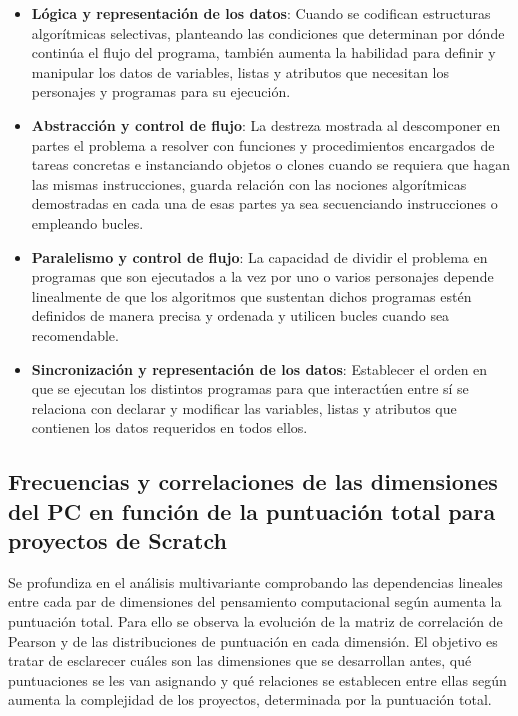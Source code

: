 \documentclass[a4paper, 12pt]{book}
\begin{document}
\begin{itemize}
    \item \textbf{Lógica y representación de los datos}: Cuando se codifican estructuras algorítmicas selectivas, planteando las condiciones que determinan por dónde continúa el flujo del programa, también aumenta la habilidad para definir y manipular los datos de variables, listas y atributos que necesitan los personajes y programas para su ejecución.
    \item \textbf{Abstracción y control de flujo}: La destreza mostrada al descomponer en partes el problema a resolver con funciones y procedimientos encargados de tareas concretas e instanciando objetos o clones cuando se requiera que hagan las mismas instrucciones, guarda relación con las nociones algorítmicas demostradas en cada una de esas partes ya sea secuenciando instrucciones o empleando bucles.
    \item \textbf{Paralelismo y control de flujo}: La capacidad de dividir el problema en programas que son ejecutados a la vez por uno o varios personajes depende linealmente de que los algoritmos que sustentan dichos programas estén definidos de manera precisa y ordenada y utilicen bucles cuando sea recomendable.
    \item \textbf{Sincronización y representación de los datos}: Establecer el orden en que se ejecutan los distintos programas para que interactúen entre sí se relaciona con declarar y modificar las variables, listas y atributos que contienen los datos requeridos en todos ellos.
\end{itemize}


\subsection{Frecuencias y correlaciones de las dimensiones del PC en función de la puntuación total para proyectos de Scratch}
\label{subsec:corr_21_Scratch}

Se profundiza en el análisis multivariante comprobando las dependencias lineales entre cada par de dimensiones del pensamiento computacional según aumenta la puntuación total. Para ello se observa la evolución de la matriz de correlación de Pearson y de las distribuciones de puntuación en cada dimensión. El objetivo es tratar de esclarecer cuáles son las dimensiones que se desarrollan antes, qué puntuaciones se les van asignando y qué relaciones se establecen entre ellas según aumenta la complejidad de los proyectos, determinada por la puntuación total.
\end{document}
